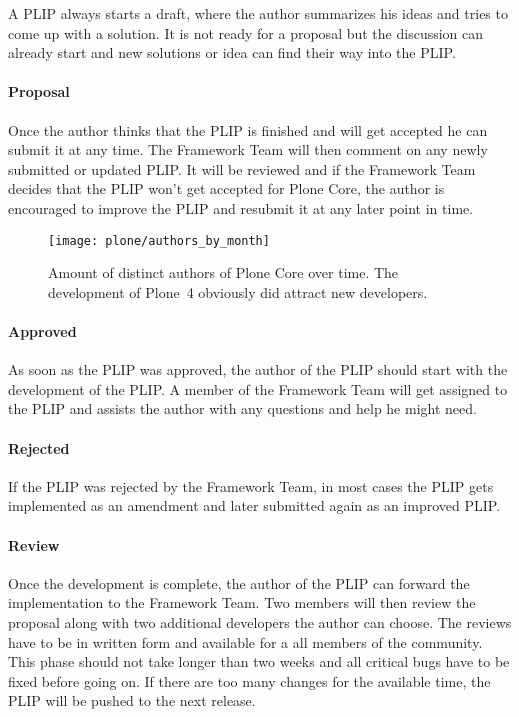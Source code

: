 A \ac{PLIP} always starts a draft, where the author summarizes his ideas and
tries to come up with a solution. It is not ready for a proposal but the
discussion can already start and new solutions or idea can find their way into
the \ac{PLIP}.

\paragraph{Proposal}

Once the author thinks that the \ac{PLIP} is finished and will get accepted he
can submit it at any time. The Framework Team will then comment on any newly
submitted or updated \ac{PLIP}. It will be reviewed and if the Framework Team
decides that the \ac{PLIP} won't get accepted for Plone Core, the author is
encouraged to improve the \ac{PLIP} and resubmit it at any later point in time.

\begin{figure}[hbtp]
  \centering
  \texttt{[image: plone/authors\_by\_month]}
  \caption{Amount of distinct authors of Plone Core over time. The development
  of Plone~4 obviously did attract new developers.}
\end{figure}

\paragraph{Approved}

As soon as the \ac{PLIP} was approved, the author of the \ac{PLIP} should start
with the development of the \ac{PLIP}. A member of the Framework Team will get
assigned to the \ac{PLIP} and assists the author with any questions and help he
might need.

\paragraph{Rejected}

If the \ac{PLIP} was rejected by the Framework Team, in most cases the
\ac{PLIP} gets implemented as an amendment and later submitted again as an
improved \ac{PLIP}.

\paragraph{Review}

Once the development is complete, the author of the \ac{PLIP} can forward the
implementation to the Framework Team. Two members will then review the proposal
along with two additional developers the author can choose. The reviews have to
be in written form and available for a all members of the community. This phase
should not take longer than two weeks and all critical bugs have to be fixed
before going on. If there are too many changes for the available time, the
\ac{PLIP} will be pushed to the next release.

